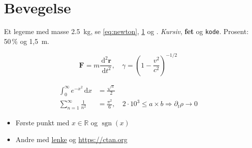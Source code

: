\documentclass[a4paper, 11pt]{article}
\newcommand{\dd}[1]{\,\mathrm{d}#1}
\renewcommand{\vec}[2][]{\mathbf{#2}_{#1}}
\DeclareMathOperator{\sgn}{sgn}
\begin{document}
\section{Bevegelse}\label{sec:bevegelse}
Et legeme med masse \SI{2.5}{kg}, se \eqref{eq:newton}, \ref{sec:bevegelse} og \cite{feynman}.
\emph{Kursiv}, \textbf{fet} og \texttt{kode}. Prosent: 50\,\% og 1,5~m.

\begin{equation}
  \vec{F} = m\frac{\dd{}^2 \vec{r}}{\dd{t}^2}, \quad \gamma = \left(1 - \frac{v^2}{c^2}\right)^{-1/2}
  \label{eq:newton}
\end{equation}

\begin{align*}
  \int_0^\infty e^{-x^2}\dd{x} &= \frac{\sqrt{\pi}}{2} \\
  \sum_{n=1}^{\infty} \frac{1}{n^2} &= \frac{\pi^2}{6}, \quad 2 \cdot 10^{3} \leq a \times b \Longrightarrow \partial_t \rho \to 0
\end{align*}

\begin{itemize}
  \item Første punkt med $x \in \mathbb{R}$ og $\sgn(x)$
  \item Andre med \href{https://example.com}{lenke} og \url{https://ctan.org}
\end{itemize}


\ifdefined\dd \relax \else \fi
\end{document}

